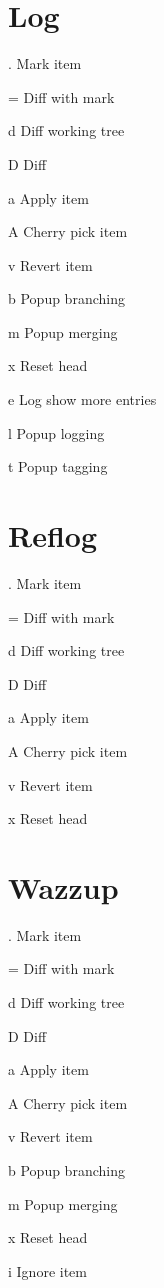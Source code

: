 \documentclass[11pt,a4paper]{article}
\begin{document}
\begin{multicols}{2}
\section{Log}
\begin{eqlist}
\item[.] Mark item
\item[=] Diff with mark
\item[d] Diff working tree
\item[D] Diff
\item[a] Apply item
\item[A] Cherry pick item
\item[v] Revert item
\item[b] Popup branching
\item[m] Popup merging 
\item[x] Reset head
\item[e] Log show more entries
\item[l] Popup logging
\item[t] Popup tagging
\end{eqlist}

\section{Reflog}
\begin{eqlist}
\item[.] Mark item
\item[=] Diff with mark
\item[d] Diff working tree
\item[D] Diff
\item[a] Apply item
\item[A] Cherry pick item
\item[v] Revert item
\item[x] Reset head
\end{eqlist}

\section{Wazzup}
\begin{eqlist}
\item[.] Mark item
\item[=] Diff with mark
\item[d] Diff working tree
\item[D] Diff
\item[a] Apply item
\item[A] Cherry pick item
\item[v] Revert item
\item[b] Popup branching
\item[m] Popup merging 
\item[x] Reset head
\item[i] Ignore item
\end{eqlist}


\end{multicols}
\end{document}

